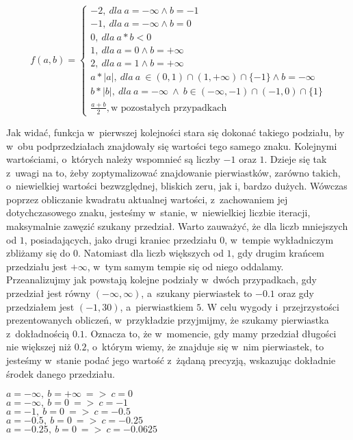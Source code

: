 \[
f(a,b)=\left\{
\begin{array}{ll}
-2,\ dla\ a=-\infty \wedge b=-1\\
-1,\ dla\ a=-\infty \wedge b=0\\
0,\ dla\ a*b<0\\
1,\ dla\ a=0 \wedge b=+\infty\\
2,\ dla\ a=1 \wedge b=+\infty\\
a*|a|,\ dla\ a~\in (0,1) \cap (1,+\infty) \cap \{-1\} \wedge b=-\infty\ \\
b*|b|,\ dla\ a=-\infty\ \wedge \ b \in (-\infty,-1) \cap (-1,0) \cap \{1\}\\
\frac{a+b}{2},\text{w pozostałych przypadkach}
\end{array}
\right.
\]

Jak widać, funkcja w~pierwszej kolejności stara się dokonać takiego podziału, by w~obu podprzedziałach znajdowały się wartości tego samego znaku. Kolejnymi wartościami, o~których należy wspomnieć są liczby $-1$ oraz $1$. Dzieje się tak z~uwagi na to, żeby zoptymalizować znajdowanie pierwiastków, zarówno takich, o~niewielkiej wartości bezwzględnej, bliskich zeru, jak i, bardzo dużych. Wówczas poprzez obliczanie kwadratu aktualnej wartości, z~zachowaniem jej dotychczasowego znaku, jesteśmy w~stanie, w~niewielkiej liczbie iteracji, maksymalnie zawęzić szukany przedział. Warto zauważyć, że dla liczb mniejszych od $1$, posiadających, jako drugi kraniec przedziału $0$, w~tempie wykładniczym zbliżamy się do $0$. Natomiast dla liczb większych od $1$, gdy drugim krańcem przedziału jest $+\infty$, w~tym samym tempie się od niego oddalamy. Przeanalizujmy jak powstają kolejne podziały w~dwóch przypadkach, gdy przedział jest równy $(-\infty,\infty)$, a~szukany pierwiastek to $-0.1$ oraz gdy przedziałem jest $(-1,30)$, a~pierwiastkiem $5$. W celu wygody i~przejrzystości prezentowanych obliczeń, w~przykładzie przyjmijmy, że szukamy pierwiastka z~dokładnością $0.1$. Oznacza to, że w~momencie, gdy mamy przedział długości nie większej niż $0.2$, o~którym wiemy, że znajduje się w~nim pierwiastek, to jesteśmy w~stanie podać jego wartość z~żądaną precyzją, wskazując dokładnie środek danego przedziału.

\begin{example}
	$ $ \\
	$a = -\infty,\ b = +\infty\ =>\ c=0$ \\
	$a = -\infty,\ b = 0\ =>\ c=-1$ \\
	$a = -1,\ b = 0\ =>\ c=-0.5$ \\
	$a = -0.5,\ b = 0\ =>\ c=-0.25$ \\
	$a = -0.25,\ b = 0\ =>\ c=-0.0625$
\end{example}

